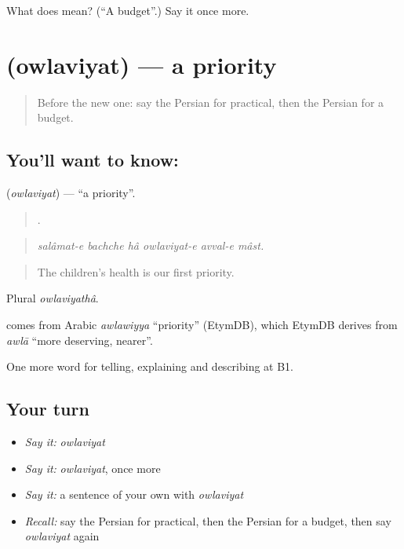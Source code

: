\begin{tcolorbox}[breakable,colback=teal!4,colframe=teal!35!black,title={Before you move on}]
What does  mean? (\textquotedblleft{}A budget\textquotedblright{}.) Say it once more.
\end{tcolorbox}
\section[\texorpdfstring{\fa{اولویت} (owlaviyat)}{اولویت (owlaviyat)}]{ (owlaviyat) — a priority}

\label{lesson:FA-C398-owlaviyyat}



\begin{quote}
Before the new one: say the Persian for practical, then the Persian for a budget.
\end{quote}

\subsection*{You'll want to know: }
\textbf{} (\emph{owlaviyat}) — \textquotedblleft{}a priority\textquotedblright{}.

\begin{quote}
     .
\end{quote}

\begin{quote}
\emph{salâmat-e bachche hâ owlaviyat-e avval-e mâst.}
\end{quote}

\begin{quote}
The children's health is our first priority.
\end{quote}

Plural \emph{owlaviyathâ}.

\begin{cousinweb}
\textbf{} comes from Arabic \emph{awlawiyya} \textquotedblleft{}priority\textquotedblright{} (EtymDB), which EtymDB derives from \emph{awlā} \textquotedblleft{}more deserving, nearer\textquotedblright{}.
\end{cousinweb}

\begin{grammarlens}[title={What you've built}]
One more word for telling, explaining and describing at B1.
\end{grammarlens}

\subsection*{Your turn}
\begin{itemize}
\raggedright
  \item \emph{Say it:} \emph{owlaviyat}
  \item \emph{Say it:} \emph{owlaviyat}, once more
  \item \emph{Say it:} a sentence of your own with \emph{owlaviyat}
  \item \emph{Recall:} say the Persian for practical, then the Persian for a budget, then say \emph{owlaviyat} again
\end{itemize}

